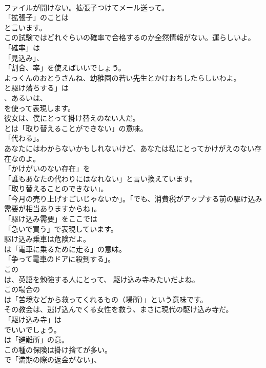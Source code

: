 \documentclass[8pt]{extreport}
\begin{document}
\begin{CJK}{UTF8}{min}
\\	ファイルが開けない。拡張子つけてメール送って。 
\\	「拡張子」のことは
\\	と言います。	
\\	この試験ではどれぐらいの確率で合格するのか全然情報がない。運らしいよ。 
\\	「確率」は
\\	「見込み」、
\\	「割合、率」を使えばいいでしょう。	
\\	よっくんのおとうさんね、幼稚園の若い先生とかけおちしたらしいわよ。 
\\	と駆け落ちする」は
\\	、あるいは、
\\	を使って表現します。	
\\	彼女は、僕にとって掛け替えのない人だ。 
\\	とは「取り替えることができない」の意味。
\\	「代わる」。	
\\	あなたにはわからないかもしれないけど、あなたは私にとってかけがえのない存在なのよ。 
\\	「かけがいのない存在」を
\\	「誰もあなたの代わりにはなれない」と言い換えています。
\\	「取り替えることのできない」。	
\\	「今月の売り上げすごいじゃないか」。「でも、消費税がアップする前の駆け込み需要が相当ありますからね」。 
\\	「駆け込み需要」をここでは
\\	「急いで買う」で表現しています。	
\\	駆け込み乗車は危険だよ。 
\\	は「電車に乗るために走る」の意味。
\\	「争って電車のドアに殺到する」。	
\\	この
\\	は、英語を勉強する人にとって、 駆け込み寺みたいだよね。 
\\	この場合の 
\\	は「苦境などから救ってくれるもの（場所）」という意味です。	
\\	その教会は、逃げ込んでくる女性を救う、まさに現代の駆け込み寺だ。 
\\	「駆け込み寺」は
\\	でいいでしょう。
\\	は「避難所」の意。	
\\	この種の保険は掛け捨てが多い。 
\\	で「満期の際の返金がない」、

\end{CJK}
\end{document}
